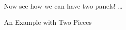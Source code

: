 \begin{figure}[H]
    \caption{An Example with Two Pieces}
    \label{fig:two_panels}
    \centering

    \vspace{0.2cm}
    \begin{minipage}{0.95\textwidth} 
	{\footnotesize Now see how we can have two panels! \ldots
	\par
	}
	\end{minipage}
\end{figure}
